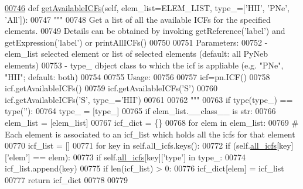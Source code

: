 \begin{DoxyCode}
\hypertarget{classpyneb_1_1core_1_1icf_1_1_i_c_f_l00746}{}\hyperlink{classpyneb_1_1core_1_1icf_1_1_i_c_f_a45f65185e75b6f98d08656c918385b38}{00746}     \textcolor{keyword}{def }\hyperlink{classpyneb_1_1core_1_1icf_1_1_i_c_f_a45f65185e75b6f98d08656c918385b38}{getAvailableICFs}(self, elem\_list=ELEM\_LIST, type\_=['HII', 'PNe', 'All']):
00747         \textcolor{stringliteral}{""" }
00748 \textcolor{stringliteral}{        Get a list of all the available ICFs for the specified elements. }
00749 \textcolor{stringliteral}{        Details can be obtained by invoking getReference('label') and getExpression('label') or
       printAllICFs()}
00750 \textcolor{stringliteral}{        }
00751 \textcolor{stringliteral}{        Parameters:}
00752 \textcolor{stringliteral}{            - elem\_list    selected element or list of selected elements (default: all PyNeb elements)}
00753 \textcolor{stringliteral}{            - type\_         dbject class to which the icf is appliable (e.g. "PNe", "HII"; default: both)}
00754 \textcolor{stringliteral}{        }
00755 \textcolor{stringliteral}{        Usage:}
00756 \textcolor{stringliteral}{        }
00757 \textcolor{stringliteral}{        icf=pn.ICF()}
00758 \textcolor{stringliteral}{        icf.getAvailableICFs()}
00759 \textcolor{stringliteral}{        icf.getAvailableICFs('S')}
00760 \textcolor{stringliteral}{        icf.getAvailableICFs('S', type\_='HII')}
00761 \textcolor{stringliteral}{}
00762 \textcolor{stringliteral}{        """}        
00763         \textcolor{keywordflow}{if} type(type\_) == type(\textcolor{stringliteral}{''}):
00764             type\_ = [type\_] 
00765         \textcolor{keywordflow}{if} elem\_list.\_\_class\_\_ \textcolor{keywordflow}{is} str:
00766             elem\_list = [elem\_list]
00767         icf\_dict = \{\}
00768         \textcolor{keywordflow}{for} elem \textcolor{keywordflow}{in} elem\_list:
00769             \textcolor{comment}{# Each element is associated to an icf\_list which holds all the icfs for that element }
00770             icf\_list = []
00771             \textcolor{keywordflow}{for} key \textcolor{keywordflow}{in} self.all\_icfs.keys():
00772                 \textcolor{keywordflow}{if} (self.\hyperlink{classpyneb_1_1core_1_1icf_1_1_i_c_f_a854ee87a53feb102e429e902227ce88b}{all\_icfs}[key][\textcolor{stringliteral}{'elem'}] == elem):
00773                     \textcolor{keywordflow}{if} self.\hyperlink{classpyneb_1_1core_1_1icf_1_1_i_c_f_a854ee87a53feb102e429e902227ce88b}{all\_icfs}[key][\textcolor{stringliteral}{'type'}] \textcolor{keywordflow}{in} type\_:
00774                         icf\_list.append(key)
00775             \textcolor{keywordflow}{if} len(icf\_list) > 0:
00776                 icf\_dict[elem] = icf\_list        
00777         \textcolor{keywordflow}{return} icf\_dict
00778    
00779     
\end{DoxyCode}
\hypertarget{classpyneb_1_1core_1_1icf_1_1_i_c_f_a0a07d882935f470f4c51af82ed785217}{}
